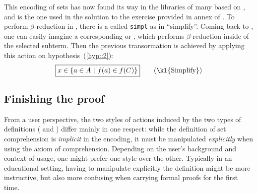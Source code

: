 \AP This encoding of sets has now found its way in the libraries of many
 based on , and is the one used in the
 solution to the exercise provided in annex of
\cite{bartzia:hal-04087080}. To perform $\beta$-reduction in , there is
a  called \texttt{simpl} as in ``simplify''. Coming back to , one can
easily imagine a corresponding  or 
, which performs $\beta$-reduction inside of the selected
subterm. Then the previous transormation is achieved by applying this action on
hypothesis~(\ref{hyp::2}):
$$\select{x \in \compr{a \in A}{f(a) \in f(C)}} \qquad \text{(\kl{Simplify})}$$

\subsection{Finishing the proof}

From a user perspective, the two styles of actions induced by the two types of
definitions ( and ) differ mainly in one
respect: while the definition of set comprehension is \emph{implicit} in the
 encoding, it must be manipulated \emph{explicitly} when
using the axiom of comprehension. Depending on the user's background and context of usage, one might
prefer one style over the other. Typically in an educational setting, having to
manipulate explicitly the  definition might be more instructive,
but also more confusing when carrying formal proofs for the first time.


